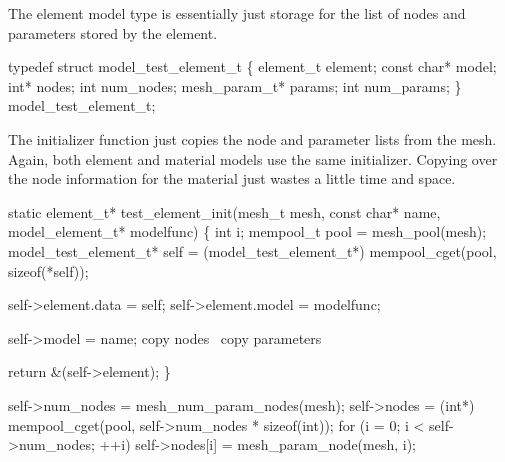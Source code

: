 The element model type is essentially just storage for the list
of nodes and parameters stored by the element.

\nwenddocs{}\endmoddef
typedef struct model_test_element_t \{
    element_t element;
    const char* model;
    int* nodes;
    int num_nodes;
    mesh_param_t* params;
    int num_params;
\} model_test_element_t;

\nwendcode{}\nwdocspar

The initializer function just copies the node and parameter
lists from the mesh.  Again, both element and material models
use the same initializer.  Copying over the node information for
the material just wastes a little time and space.

\nwenddocs{}\endmoddef
static element_t* test_element_init(mesh_t mesh, const char* name,
                                    model_element_t* modelfunc)
\{
    int i;
    mempool_t pool = mesh_pool(mesh);
    model_test_element_t* self = (model_test_element_t*)
        mempool_cget(pool, sizeof(*self));

    self->element.data = self;
    self->element.model = modelfunc;

    self->model = name;
    \LA{}copy nodes~{\nwtagstyle{}}\RA{}
    \LA{}copy parameters~{\nwtagstyle{}}\RA{}

    return &(self->element);
\}

\nwendcode{}\nwdocspar

\nwenddocs{}\endmoddef
self->num_nodes = mesh_num_param_nodes(mesh);
self->nodes = (int*) 
    mempool_cget(pool, self->num_nodes * sizeof(int));
for (i = 0; i < self->num_nodes; ++i)
    self->nodes[i] = mesh_param_node(mesh, i);
\nwendcode{}\nwdocspar

